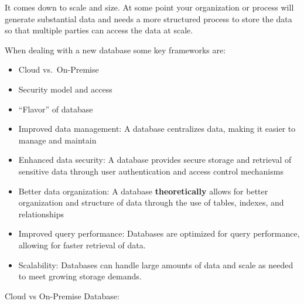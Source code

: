 \documentclass[
  letterpaper,
  DIV=11,
  numbers=noendperiod]{scrreprt}
\begin{document}
\begin{tcolorbox}[enhanced jigsaw, title=\textcolor{quarto-callout-note-color}{\faInfo}\hspace{0.5em}{``What is the advantage of a database?''}, bottomrule=.15mm, titlerule=0mm, left=2mm, rightrule=.15mm, opacityback=0, colframe=quarto-callout-note-color-frame, bottomtitle=1mm, coltitle=black, colback=white, leftrule=.75mm, breakable, colbacktitle=quarto-callout-note-color!10!white, opacitybacktitle=0.6, toprule=.15mm, toptitle=1mm, arc=.35mm]

It comes down to scale and size. At some point your organization or
process will generate substantial data and needs a more structured
process to store the data so that multiple parties can access the data
at scale.

When dealing with a new database some key frameworks are:

\begin{itemize}
\item
  Cloud vs.~On-Premise
\item
  Security model and access
\item
  ``Flavor'' of database
\item
  Improved data management: A database centralizes data, making it
  easier to manage and maintain
\item
  Enhanced data security: A database provides secure storage and
  retrieval of sensitive data through user authentication and access
  control mechanisms
\item
  Better data organization: A database \textbf{theoretically} allows for
  better organization and structure of data through the use of tables,
  indexes, and relationships
\item
  Improved query performance: Databases are optimized for query
  performance, allowing for faster retrieval of data.
\item
  Scalability: Databases can handle large amounts of data and scale as
  needed to meet growing storage demands.
\end{itemize}

Cloud vs On-Premise Database:


\end{tcolorbox}
\end{document}

